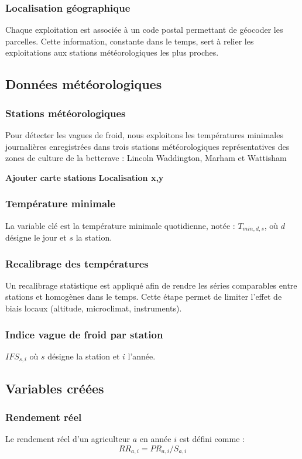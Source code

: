 \documentclass[11pt,a4paper,openright,twoside]{report}
\begin{document}
\subsubsection{Localisation géographique}
Chaque exploitation est associée à un code postal permettant de géocoder les parcelles. Cette information, constante dans le temps, sert à relier les exploitations aux stations météorologiques les plus proches.

\subsection{Données météorologiques}
\subsubsection{Stations météorologiques}
Pour détecter les vagues de froid, nous exploitons les températures minimales journalières enregistrées dans trois stations météorologiques représentatives des zones de culture de la betterave : Lincoln Waddington, Marham et Wattisham

\textbf{Ajouter carte stations}
\textbf{Localisation x,y}

\subsubsection{Température minimale}
La variable clé est la température minimale quotidienne, notée :  
$T_{min,d,s}$, où $d$ désigne le jour et $s$ la station.

\subsubsection{Recalibrage des températures}
Un recalibrage statistique est appliqué afin de rendre les séries comparables entre stations et homogènes dans le temps. Cette étape permet de limiter l’effet de biais locaux (altitude, microclimat, instruments). 

\subsubsection{Indice vague de froid par station}
$IFS_{s,i}$ où $s$ désigne la station et $i$ l'année.

\subsection{Variables créées}

\subsubsection{Rendement réel}
Le rendement réel d’un agriculteur $a$ en année $i$ est défini comme :
\[RR_{a,i} = PR_{a,i} / S_{a,i}\]
\end{document}
